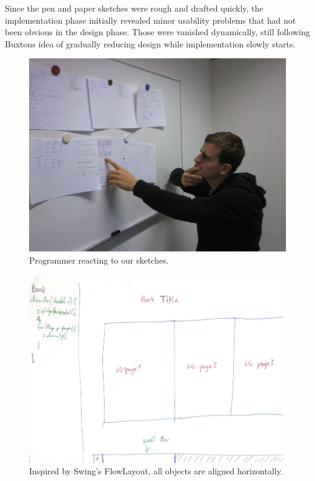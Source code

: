 \documentclass[english]{scrartcl}
\begin{document}
Since the pen and paper sketches were rough and drafted quickly, the implementation phase initially revealed minor usability problems that had not been obvious in the design phase.
Those were vanished dynamically, still following Buxtons idea of gradually reducing design while implementation slowly starts.

\begin{figure}[h]
	\includegraphics[width=\linewidth]{img/design-sketches_thinker.jpg}
	\caption[Confronting people with design sketches]{Programmer reacting to our sketches.}
\end{figure}

\begin{figure}[h]
	\includegraphics[width=\linewidth]{img/sketches/032.jpg}
	\caption[Bad sketch example: Horizontal and vertical alignment]{Inspired by Swing's FlowLayout, all objects are aligned horizontally.}
\end{figure}
\end{document}
